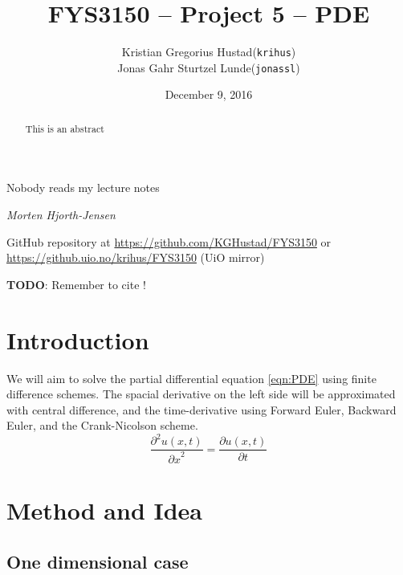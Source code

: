 \documentclass[10pt,a4paper]{article}
\newcommand{\pt}{{\partial t}}
\newcommand{\px}{{\partial x}}
\newcommand{\pu}{{\partial u}}
\newcommand{\ppu}{{\partial^2 u}}
\begin{document}
\title{FYS3150 -- Project 5 -- PDE}
\author{
	\begin{tabular}{rl}
        Kristian Gregorius Hustad & (\texttt{krihus})\\
        Jonas Gahr Sturtzel Lunde & (\texttt{jonassl})
	\end{tabular}}
\date{December 9, 2016}
\maketitle



\setlength{\epigraphwidth}{0.75\textwidth}
\renewcommand{\epigraphflush}{center}
\renewcommand{\beforeepigraphskip}{50pt}
\renewcommand{\afterepigraphskip}{100pt}
\renewcommand{\epigraphsize}{\normalsize}
\epigraph{Nobody reads my lecture notes}
	{\textit{Morten Hjorth-Jensen}}

\begin{abstract}
\noindent
This is an abstract
\end{abstract}

\vfill


\begin{center}
    GitHub repository at \url{https://github.com/KGHustad/FYS3150}
    or \url{https://github.uio.no/krihus/FYS3150} (UiO mirror)
\end{center}


\pagebreak




\textbf{TODO}: Remember to cite \cite{hpl_fdm}!

\section{Introduction}
We will aim to solve the partial differential equation \ref{eqn:PDE} using finite difference schemes. The spacial derivative on the left side will be approximated with central difference, and the time-derivative using Forward Euler, Backward Euler, and the Crank-Nicolson scheme.
\begin{equation}\label{eqn:PDE}
\frac{\ppu(x,t)}{\px^2} = \frac{\pu(x,t)}{\pt}
\end{equation}

\section{Method and Idea}
\subsection{One dimensional case}
\end{document}
